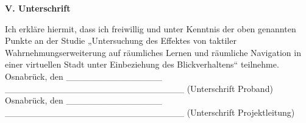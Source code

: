 \begin{center}
	\large{\textbf{V. Unterschrift}} \\
\end{center}


Ich erkläre hiermit, dass ich freiwillig und unter Kenntnis der oben genannten Punkte an der Studie „Untersuchung des Effektes von taktiler Wahrnehmungserweiterung auf räumliches Lernen und räumliche Navigation in einer virtuellen Stadt unter Einbeziehung des Blickverhaltens“ teilnehme. \\


Osnabrück, den \_\_\_\_\_\_\_\_\_\_\_\_\_\_\_  \_\_\_\_\_\_\_\_\_\_\_\_\_\_\_\_\_\_\_\_\_\_\_\_\_\_\_\_ (Unterschrift Proband) \\


Osnabrück, den \_\_\_\_\_\_\_\_\_\_\_\_\_\_\_ \_\_\_\_\_\_\_\_\_\_\_\_\_\_\_\_\_\_\_\_\_\_\_\_\_\_\_\_ (Unterschrift Projektleitung)




